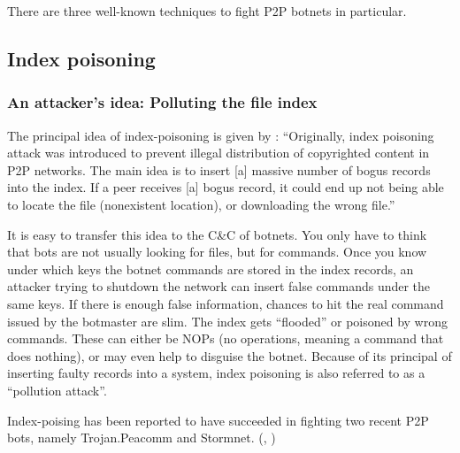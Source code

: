 \documentclass{llncs}
\begin{document}
There are three well-known techniques to fight P2P botnets in
particular.

\subsection{Index poisoning}
\label{indexpoisoning}
\subsubsection{An attacker's idea: Polluting the file index}
The principal idea of index-poisoning is given by
\cite{wang2009systematic}: ``Originally, index poisoning attack was
introduced to prevent illegal distribution of copyrighted content in
P2P networks. The main idea is to insert [a] massive number of bogus
records into the index. If a peer receives [a] bogus record, it could end
up not being able to locate the file (nonexistent location), or
downloading the wrong file.''

It is easy to transfer this idea to the C\&C of botnets. You only have
to think that bots are not usually looking for files, but for
commands. Once you know under which keys the botnet commands are
stored in the index records, an attacker trying to shutdown the
network can insert false commands under the same keys. If there is
enough false information, chances to hit the real command issued by
the botmaster are slim. The index gets ``flooded'' or poisoned by wrong
commands. These can either be NOPs (no operations, meaning a command
that does nothing), or may even help to disguise the botnet. Because
of its principal of inserting faulty records into a system, index
poisoning is also referred to as a ``pollution
attack''\cite{liang2006index}.

Index-poising has been reported to have succeeded
in fighting two recent P2P bots, namely Trojan.Peacomm and
Stormnet. (\cite{grizzard2007peer}, \cite{liang2006index})
\end{document}
